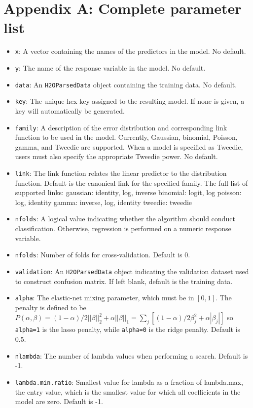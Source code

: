 \documentclass[11pt]{article}
\begin{document}
\section{Appendix A: Complete parameter list}
\begin{itemize}
\item \texttt{x}: A vector containing the names of the predictors in the model. No default.
\item \texttt{y}: The name of the response variable in the model. No default.
\item \texttt{data}: An \texttt{H2OParsedData} object containing the training data. No default.
\item \texttt{key}: The unique hex key assigned to the resulting model. If none is given, a key will automatically be generated.
\item \texttt{family}: A description of the error distribution and corresponding link function to be used in the model. Currently, Gaussian, binomial, Poisson, gamma, and Tweedie are supported. When a model is specified as Tweedie, users must also specify the appropriate Tweedie power. No default.
\item \texttt{link}: The link function relates the linear predictor to the distribution function. Default is the canonical link for the specified family. The full list of supported links: 
	gaussian: identity, log, inverse 
	binomial: logit, log 
	poisson: log, identity
	gamma: inverse, log, identity
	tweedie: tweedie 
\item \texttt{nfolds}: A logical value indicating whether the algorithm should conduct classification. Otherwise, regression is performed on a numeric response variable.
\item \texttt{nfolds}: Number of folds for cross-validation. Default is 0.
\item \texttt{validation}: An \texttt{H2OParsedData} object indicating the validation dataset used to construct confusion matrix. If left blank, default is the training data.
\item \texttt{alpha}: The elastic-net mixing parameter, which must be in $[0,1]$. The penalty is defined to be $P(\alpha,\beta) = (1-\alpha)/2||\beta||_2^2 + \alpha||\beta||_1 = \sum_j [(1-\alpha)/2 \beta_j^2 + \alpha|\beta_j|] $ so \texttt{alpha=1} is the lasso penalty, while \texttt{alpha=0} is the ridge penalty. Default is 0.5.
\item \texttt{nlambda}: The number of lambda values when performing a search. Default is -1.
\item \texttt{lambda.min.ratio}: Smallest value for lambda as a fraction of lambda.max, the entry value, which is the smallest value for which all coefficients in the model are zero. Default is -1.

\end{itemize}
\end{document}
